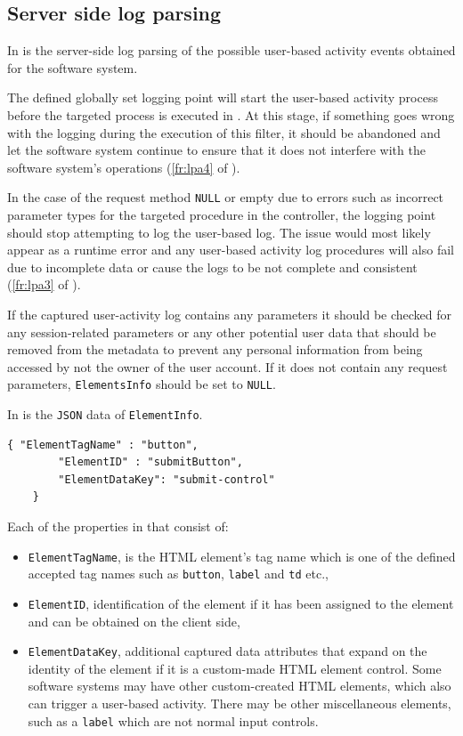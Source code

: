 \clearpage

\subsection{Server side log parsing}
In  is the server-side log parsing of the possible user-based activity events obtained for the software system.\par The defined globally set logging point will start the user-based activity process before the targeted process is executed in . At this stage, if something goes wrong with the logging during the execution of this filter, it should be abandoned and let the software system continue to ensure that it does not interfere with the software system's operations (\ref{fr:lpa4} of ).\par In the case of the request method \texttt{NULL} or empty due to errors such as incorrect parameter types for the targeted procedure in the controller, the logging point should stop attempting to log the user-based log. The issue would most likely appear as a runtime error and any user-based activity log procedures will also fail due to incomplete data or cause the logs to be not complete and consistent (\ref{fr:lpa3} of ).\par If the captured user-activity log contains any parameters it should be checked for any session-related parameters or any other potential user data that should be removed from the metadata to prevent any personal information from being accessed by not the owner of the user account. If it does not contain any request parameters, \texttt{ElementsInfo} should be set to \texttt{NULL}.\par In  is the \texttt{JSON} data of \texttt{ElementInfo}. 

\begin{lstlisting}[style=json, caption={\textit{Element properties JSON}}, label={fig:Ch2_ElementInfo}] 
	{ "ElementTagName" : "button",
		"ElementID" : "submitButton",
		"ElementDataKey": "submit-control"		
	}
\end{lstlisting}

Each of the properties in  that consist of:

\begin{itemize}
	\item \texttt{ElementTagName}, is the HTML element's tag name which is one of the defined accepted tag names such as \texttt{button}, \texttt{label} and \texttt{td} etc.,
	\item \texttt{ElementID}, identification of the element if it has been assigned to the element and can be obtained on the client side,
	\item \texttt{ElementDataKey}, additional captured data attributes that expand on the identity of the element if it is a custom-made HTML element control. Some software systems may have other custom-created HTML elements, which also can trigger a user-based activity. There may be other miscellaneous elements, such as a \texttt{label} which are not normal input controls.
\end{itemize}

